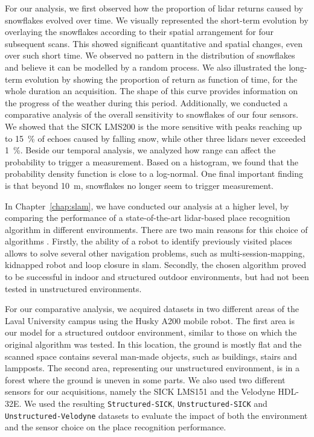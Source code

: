 For our analysis, we first observed how the proportion of \gls*{lidar} returns caused by snowflakes evolved over time. We visually represented the short-term evolution by overlaying the snowflakes according to their spatial arrangement for four subsequent scans. This showed significant quantitative and spatial changes, even over such short time. We observed no pattern in the distribution of snowflakes and believe it can be modelled by a random process. We also illustrated the long-term evolution by showing the proportion of return as function of time, for the whole duration an acquisition. The shape of this curve provides information on the progress of the weather during this period. Additionally, we conducted a comparative analysis of the overall sensitivity to snowflakes of our four sensors. We showed that the SICK LMS200 is the more sensitive with peaks reaching up to \SI{15}{\percent} of echoes caused by falling snow, while other three \gls*{lidar}s never exceeded \SI{1}{\percent}. Beside our temporal analysis, we analyzed how range can affect the probability to trigger a measurement. Based on a histogram, we found that the probability density function is close to a log-normal. One final important finding is that beyond \SI{10}{\meter}, snowflakes no longer seem to trigger measurement.

In Chapter~\ref{chap:slam}, we have conducted our analysis at a higher level, by comparing the performance of a state-of-the-art \gls*{lidar}-based place recognition algorithm in different environments. There are two main reasons for this choice of algorithms . Firstly, the ability of a robot to identify previously visited places allows to solve several other navigation problems, such as multi-session-mapping, kidnapped robot and loop closure in \gls*{slam}. Secondly, the chosen algorithm proved to be successful in indoor and structured outdoor environments, but had not been tested in unstructured environments.

For our comparative analysis, we acquired datasets in two different areas of the Laval University campus using the Husky A200 mobile robot. The first area is our model for a structured outdoor environment, similar to those on which the original algorithm was tested. In this location, the ground is mostly flat and the scanned space contains several man-made objects, such as buildings, stairs and lampposts. The second area, representing our unstructured environment, is in a forest where the ground is uneven in some parts. We also used two different sensors for our acquisitions, namely the SICK LMS151 and the Velodyne HDL-32E. We used the resulting \texttt{Structured-SICK}, \texttt{Unstructured-SICK} and \texttt{Unstructured-Velodyne} datasets to evaluate the impact of both the environment and the sensor choice on the place recognition performance.

